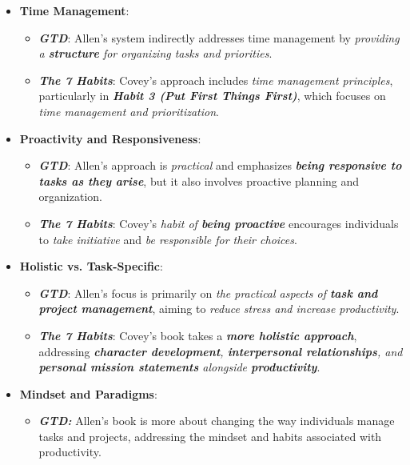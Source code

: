 \documentclass[11pt]{article}
\begin{document}
\begin{itemize}
\begin{itemize}
\item \textbf{Time Management}:
\begin{itemize}
\item \emph{\textbf{GTD}}: Allen's system indirectly addresses time management by \emph{providing a \textbf{structure} for organizing tasks and priorities}.

\item \emph{\textbf{The 7 Habits}}: Covey's approach includes \emph{time management principles}, particularly in \emph{\textbf{Habit 3 (Put First Things First)}}, which focuses on \emph{time management and prioritization}.
\end{itemize}

\item \textbf{Proactivity and Responsiveness}:
\begin{itemize}
\item \emph{\textbf{GTD}}: Allen's approach is \emph{practical} and emphasizes \emph{\textbf{being responsive to tasks as they arise}}, but it also involves proactive planning and organization.

\item \emph{\textbf{The 7 Habits}}: Covey's \emph{habit of \textbf{being proactive}} encourages individuals to \emph{take initiative} and \emph{be responsible for their choices}.
\end{itemize}

\item \textbf{Holistic vs. Task-Specific}:
\begin{itemize}
\item \emph{\textbf{GTD}}: Allen's focus is primarily on \emph{the practical aspects of \textbf{task and project management}}, aiming to \emph{reduce stress and increase productivity}.

\item \emph{\textbf{The 7 Habits}}: Covey's book takes a \emph{\textbf{more holistic approach}}, addressing \emph{\textbf{character development}, \textbf{interpersonal relationships}, and \textbf{personal mission statements} alongside \textbf{productivity}}.
\end{itemize}

\item \textbf{Mindset and Paradigms}:
\begin{itemize}
\item \emph{\textbf{GTD:}} Allen's book is more about changing the way individuals manage tasks and projects, addressing the mindset and habits associated with productivity.


\end{itemize}
\end{itemize}
\end{itemize}
\end{document}
